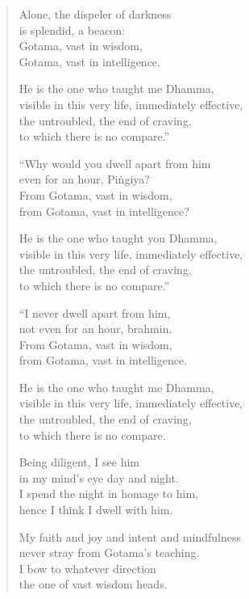 \documentclass[12pt,openany]{book}%
\begin{document}
\begin{verse}
Alone, the dispeler of darkness \\
is splendid, a beacon: \\
Gotama, vast in wisdom, \\
Gotama, vast in intelligence. 

He is the one who taught me Dhamma, \\
visible in this very life, immediately effective, \\
the untroubled, the end of craving, \\
to which there is no compare.” 

“Why would you dwell apart from him \\
even for an hour, \textsanskrit{Piṅgiya}? \\
From Gotama, vast in wisdom, \\
from Gotama, vast in intelligence? 

He is the one who taught you Dhamma, \\
visible in this very life, immediately effective, \\
the untroubled, the end of craving, \\
to which there is no compare.” 

“I never dwell apart from him, \\
not even for an hour, brahmin. \\
From Gotama, vast in wisdom, \\
from Gotama, vast in intelligence. 

He is the one who taught me Dhamma, \\
visible in this very life, immediately effective, \\
the untroubled, the end of craving, \\
to which there is no compare. 

Being diligent, I see him \\
in my mind’s eye day and night. \\
I spend the night in homage to him, \\
hence I think I dwell with him. 

My faith and joy and intent and mindfulness \\
never stray from Gotama’s teaching. \\
I bow to whatever direction \\
the one of vast wisdom heads. 


\end{verse}
\end{document}
